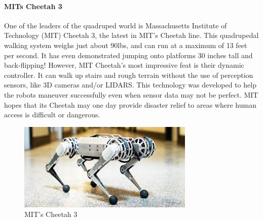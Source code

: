     \paragraph{MITs Cheetah 3}
    One of the leaders of the quadruped world is Massachusetts Institute of Technology (MIT) Cheetah 3, the latest in MIT's Cheetah line. This quadrupedal walking system weighs just about 90lbs, and can run at a maximum of 13 feet per second. It has even demonstrated jumping onto platforms 30 inches tall and back-flipping!
    However, MIT Cheetah's most impressive feat is their dynamic controller. It can walk up stairs and rough terrain without the use of perception sensors, like 3D cameras and/or LIDARS. This technology was developed to help the robots maneuver successfully even when sensor data may not be perfect. MIT hopes that its Cheetah may one day provide disaster relief to areas where human access is difficult or dangerous. %
    \begin{figure}[H]
        \centering
        \includegraphics[width=0.7\linewidth]{figures/MITCheetah.jpeg}
        \caption{MIT's Cheetah 3}
        \label{fig:MITCheetah}
    \end{figure}

